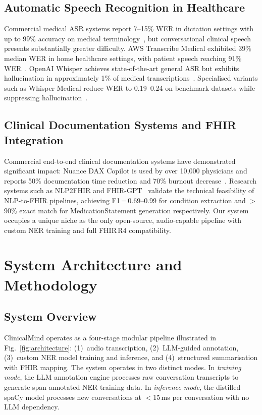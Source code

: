 \documentclass[conference]{IEEEtran}
\begin{document}
\subsection{Automatic Speech Recognition in Healthcare}

Commercial medical ASR systems report 7–15\% WER in dictation settings with
up to 99\% accuracy on medical terminology~\cite{hodgson2016evaluating}, but
conversational clinical speech presents substantially greater difficulty. AWS
Transcribe Medical exhibited 39\% median WER in home healthcare settings, with
patient speech reaching 91\% WER~\cite{chiu2021speech}. OpenAI Whisper
\cite{radford2023robust} achieves state-of-the-art general ASR but exhibits
hallucination in approximately 1\% of medical transcriptions~\cite{koenecke2024}.
Specialised variants such as Whisper-Medical reduce WER to 0.19–0.24 on
benchmark datasets while suppressing hallucination~\cite{zhang2024whispermed}.

\subsection{Clinical Documentation Systems and FHIR Integration}

Commercial end-to-end clinical documentation systems have demonstrated
significant impact: Nuance DAX Copilot is used by over 10,000 physicians and
reports 50\% documentation time reduction and 70\% burnout
decrease~\cite{tierney2024ambient}. Research systems such as NLP2FHIR
\cite{hong2019nlp2fhir} and FHIR-GPT~\cite{chen2024fhirgpt} validate the
technical feasibility of NLP-to-FHIR pipelines, achieving F1\,=\,0.69–0.99
for condition extraction and $>$90\% exact match for MedicationStatement
generation respectively. Our system occupies a unique niche as the only
open-source, audio-capable pipeline with custom NER training and full FHIR\,R4
compatibility.

\section{System Architecture and Methodology}
\label{sec:method}

\subsection{System Overview}
\label{subsec:overview}

ClinicalMind operates as a four-stage modular pipeline illustrated in
Fig.~\ref{fig:architecture}: (1)~audio transcription, (2)~LLM-guided
annotation, (3)~custom NER model training and inference, and
(4)~structured summarisation with FHIR mapping. The system operates in
two distinct modes. In \emph{training mode}, the LLM annotation engine
processes raw conversation transcripts to generate span-annotated NER
training data. In \emph{inference mode}, the distilled spaCy model
processes new conversations at $<$15\,ms per conversation with no LLM
dependency.
\end{document}
